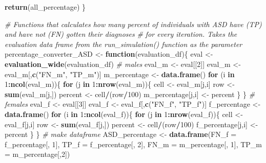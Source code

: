 \documentclass[]{article}
\newenvironment{Shaded}{\begin{snugshade}}{\end{snugshade}}
\newcommand{\KeywordTok}[1]{\textcolor[rgb]{0.13,0.29,0.53}{\textbf{#1}}}
\newcommand{\DataTypeTok}[1]{\textcolor[rgb]{0.13,0.29,0.53}{#1}}
\newcommand{\DecValTok}[1]{\textcolor[rgb]{0.00,0.00,0.81}{#1}}
\newcommand{\StringTok}[1]{\textcolor[rgb]{0.31,0.60,0.02}{#1}}
\newcommand{\CommentTok}[1]{\textcolor[rgb]{0.56,0.35,0.01}{\textit{#1}}}
\newcommand{\ControlFlowTok}[1]{\textcolor[rgb]{0.13,0.29,0.53}{\textbf{#1}}}
\newcommand{\OperatorTok}[1]{\textcolor[rgb]{0.81,0.36,0.00}{\textbf{#1}}}
\newcommand{\NormalTok}[1]{#1}
\begin{document}
\begin{Shaded}
\begin{Highlighting}[]
{{{{{{{{{{  \KeywordTok{return}\NormalTok{(all_percentage)}
\NormalTok{\}}


\CommentTok{# Functions that calculates how many percent of individuals with ASD have (TP) and have not (FN) gotten their diagnoses}
\CommentTok{# for every iteration. Takes the evaluation data frame from the run_simulation() function as the parameter}
\NormalTok{percentage_converter_ASD <-}\StringTok{ }\ControlFlowTok{function}\NormalTok{(evaluation_df)\{}
\NormalTok{  eval <-}\StringTok{ }\KeywordTok{evaluation_wide}\NormalTok{(evaluation_df)}
  \CommentTok{# males}
\NormalTok{  eval_m <-}\StringTok{ }\NormalTok{eval[[}\DecValTok{2}\NormalTok{]]}
\NormalTok{  eval_m <-}\StringTok{ }\NormalTok{eval_m[,}\KeywordTok{c}\NormalTok{(}\StringTok{"FN_m"}\NormalTok{, }\StringTok{"TP_m"}\NormalTok{)]}
\NormalTok{  m_percentage <-}\StringTok{ }\KeywordTok{data.frame}\NormalTok{()}
  \ControlFlowTok{for}\NormalTok{ (i }\ControlFlowTok{in} \DecValTok{1}\OperatorTok{:}\KeywordTok{ncol}\NormalTok{(eval_m))\{}
    \ControlFlowTok{for}\NormalTok{ (j }\ControlFlowTok{in} \DecValTok{1}\OperatorTok{:}\KeywordTok{nrow}\NormalTok{(eval_m))\{}
\NormalTok{      cell <-}\StringTok{ }\NormalTok{eval_m[j,i]}
\NormalTok{      row <-}\StringTok{ }\KeywordTok{sum}\NormalTok{(eval_m[j,])}
\NormalTok{      percent <-}\StringTok{ }\NormalTok{cell}\OperatorTok{/}\NormalTok{(row}\OperatorTok{/}\DecValTok{100}\NormalTok{)}
\NormalTok{      m_percentage[j,i] <-}\StringTok{ }\NormalTok{percent}
\NormalTok{    \}}
\NormalTok{  \}}
  \CommentTok{# females}
\NormalTok{  eval_f <-}\StringTok{ }\NormalTok{eval[[}\DecValTok{3}\NormalTok{]]}
\NormalTok{  eval_f <-}\StringTok{ }\NormalTok{eval_f[,}\KeywordTok{c}\NormalTok{(}\StringTok{"FN_f"}\NormalTok{, }\StringTok{"TP_f"}\NormalTok{)]}
\NormalTok{  f_percentage <-}\StringTok{ }\KeywordTok{data.frame}\NormalTok{()}
  \ControlFlowTok{for}\NormalTok{ (i }\ControlFlowTok{in} \DecValTok{1}\OperatorTok{:}\KeywordTok{ncol}\NormalTok{(eval_f))\{}
    \ControlFlowTok{for}\NormalTok{ (j }\ControlFlowTok{in} \DecValTok{1}\OperatorTok{:}\KeywordTok{nrow}\NormalTok{(eval_f))\{}
\NormalTok{      cell <-}\StringTok{ }\NormalTok{eval_f[j,i]}
\NormalTok{      row <-}\StringTok{ }\KeywordTok{sum}\NormalTok{(eval_f[j,])}
\NormalTok{      percent <-}\StringTok{ }\NormalTok{cell}\OperatorTok{/}\NormalTok{(row}\OperatorTok{/}\DecValTok{100}\NormalTok{)}
\NormalTok{      f_percentage[j,i] <-}\StringTok{ }\NormalTok{percent}
\NormalTok{    \}}
\NormalTok{  \}}
  \CommentTok{# make dataframe}
\NormalTok{  ASD_percentage <-}\StringTok{ }\KeywordTok{data.frame}\NormalTok{(}\DataTypeTok{FN_f =}\NormalTok{ f_percentage[, }\DecValTok{1}\NormalTok{], }\DataTypeTok{TP_f =}\NormalTok{ f_percentage[, }\DecValTok{2}\NormalTok{], }\DataTypeTok{FN_m =}\NormalTok{ m_percentage[, }\DecValTok{1}\NormalTok{], }\DataTypeTok{TP_m =}\NormalTok{ m_percentage[,}\DecValTok{2}\NormalTok{])}
  
}}}}}}}}}}
\end{Highlighting}
\end{Shaded}
\end{document}
